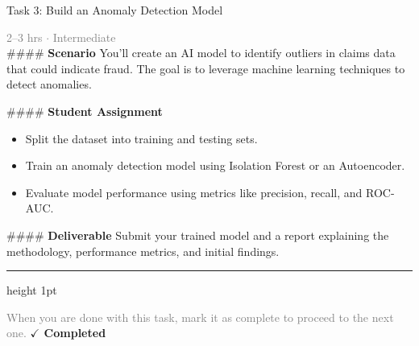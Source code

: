 \documentclass[10pt,a4paper]{article}
\begin{document}
\begin{taskbox}{Task 3: Build an Anomaly Detection Model}

    {\small \textcolor{gray}{2--3 hrs $\cdot$ Intermediate}}\\[12pt]

    \#\#\#\# \textbf{Scenario}  
You’ll create an AI model to identify outliers in claims data that could indicate fraud. The goal is to leverage machine learning techniques to detect anomalies.  

\#\#\#\# \textbf{Student Assignment}  
\begin{itemize}
    \item Split the dataset into training and testing sets.  
    \item Train an anomaly detection model using Isolation Forest or an Autoencoder.  
    \item Evaluate model performance using metrics like precision, recall, and ROC-AUC.  
\end{itemize}

\#\#\#\# \textbf{Deliverable}  
Submit your trained model and a report explaining the methodology, performance metrics, and initial findings.\par

    \vspace{16pt}

    \textcolor{cardBorder}{\hrule height 1pt}\vspace{8pt}

    \small \textcolor{gray}{When you are done with this task, mark it as complete to proceed to the next one.} \hfill \textbf{\textcolor{brandDark}{$\checkmark$ Completed}}

\end{taskbox}
\end{document}
